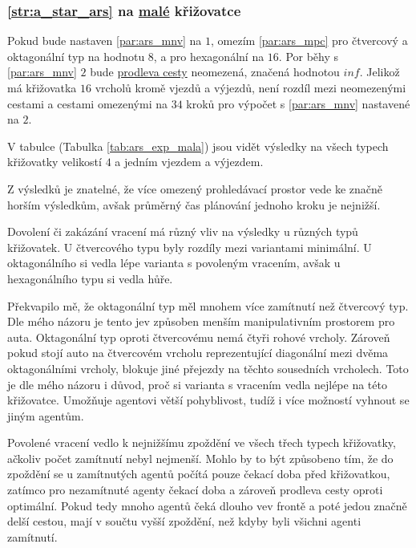 \subsubsection{\ref{str:a_star_ars} na \hyperref[par:data_mala]{malé} křižovatce}
\label{subsubsec:exp_ars_mala_krizovatka}

Pokud bude nastaven \ref{par:ars_mnv} na $1$, omezím \ref{par:ars_mpc}
pro čtvercový a oktagonální typ na hodnotu $8$, a pro hexagonální na $16$.
Por běhy s \ref{par:ars_mnv} $2$ bude \hyperref[par:ars_mpc]{prodleva cesty} neomezená, značená hodnotou $inf$.
Jelikož má křižovatka $16$ vrcholů kromě vjezdů a výjezdů, není rozdíl mezi neomezenými cestami a
cestami omezenými na $34$ kroků pro výpočet s \ref{par:ars_mnv} nastavené na $2$.



V tabulce (Tabulka \ref{tab:ars_exp_mala}) jsou vidět výsledky na všech typech křižovatky
velikostí $4$ a jedním vjezdem a výjezdem.


Z výsledků je znatelné, že více omezený prohledávací prostor vede ke značně horším výsledkům,
avšak průměrný čas plánování jednoho kroku je nejnižší.

Dovolení či zakázání vracení má různý vliv na výsledky u různých typů křižovatek.
U čtvercového typu byly rozdíly mezi variantami minimální.
U oktagonálního si vedla lépe varianta s povoleným vracením, avšak u hexagonálního typu si vedla hůře.

Překvapilo mě, že oktagonální typ měl mnohem více zamítnutí než čtvercový typ.
Dle mého názoru je tento jev způsoben menším manipulativním prostorem pro auta.
Oktagonální typ oproti čtvercovému nemá čtyři rohové vrcholy.
Zároveň pokud stojí auto na čtvercovém vrcholu reprezentující diagonální mezi dvěma oktagonálními vrcholy,
blokuje jiné přejezdy na těchto sousedních vrcholech. %
Toto je dle mého názoru i důvod, proč si varianta s vracením vedla nejlépe na této křižovatce.
Umožňuje agentovi větší pohyblivost, tudíž i více možností vyhnout se jiným agentům.

Povolené vracení vedlo k nejnižšímu zpoždění ve všech třech typech křižovatky, ačkoliv počet zamítnutí nebyl nejmenší.
Mohlo by to být způsobeno tím, že do zpoždění se u zamítnutých agentů počítá pouze čekací doba před křižovatkou,
zatímco pro nezamítnuté agenty čekací doba a zároveň prodleva cesty oproti optimální.
Pokud tedy mnoho agentů čeká dlouho vev frontě a poté jedou značně delší cestou, mají v součtu vyšší zpoždění,
než kdyby byli všichni agenti zamítnutí.

